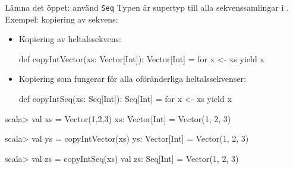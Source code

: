 \begin{Slide}{Lämna det öppet: använd \texttt{Seq}}\SlideFontSmall
Typen  är supertyp till alla sekvenssamlingar i .
\pause Exempel: kopiering av sekvens:
\begin{itemize}
\item Kopiering av  heltalssekvens:
\begin{Code}
def copyIntVector(xs: Vector[Int]): Vector[Int] = for x <- xs yield x
\end{Code}

\item Kopiering som fungerar för alla oföränderliga heltalssekvenser:
\begin{Code}
def copyIntSeq(xs: Seq[Int]): Seq[Int] = for x <- xs yield x
\end{Code}
\end{itemize}
\pause
\begin{REPL}
scala> val xs = Vector(1,2,3)
xs: Vector[Int] = Vector(1, 2, 3)

scala> val ys = copyIntVector(xs)
ys: Vector[Int] = Vector(1, 2, 3)

scala> val zs = copyIntSeq(xs)
val zs: Seq[Int] = Vector(1, 2, 3)
\end{REPL}
%
%
\end{Slide}
  
